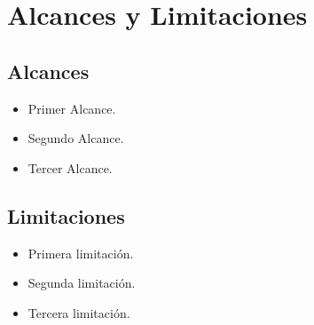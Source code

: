 \chapter{Alcances y Limitaciones}
\section{Alcances}


 \begin{itemize}
 	\item Primer Alcance.
	\item Segundo Alcance.
	\item Tercer Alcance.
 \end{itemize}
 
\section{Limitaciones}

 \begin{itemize}
 	\item Primera limitación.
	\item Segunda limitación.
	\item Tercera limitación.
 \end{itemize}
 